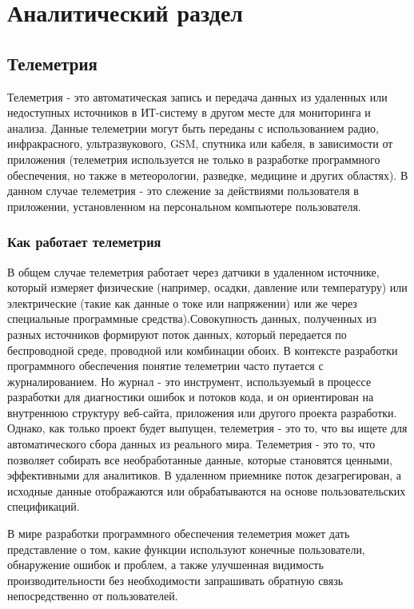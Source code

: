 \chapter{Аналитический раздел}
\label{cha:analysis}
%
%
\section{Телеметрия}
Телеметрия - это автоматическая запись и передача данных из удаленных или недоступных источников в ИТ-систему в другом месте для мониторинга и анализа. Данные телеметрии могут быть переданы с использованием радио, инфракрасного, ультразвукового, GSM, спутника или кабеля, в зависимости от приложения (телеметрия используется не только в разработке программного обеспечения, но также в метеорологии, разведке, медицине и других областях).
В данном случае телеметрия - это слежение за действиями пользователя в приложении, установленном на персональном компьютере пользователя.
\subsection{Как работает телеметрия}
В общем случае телеметрия работает через датчики в удаленном источнике, который измеряет физические (например, осадки, давление или температуру) или электрические (такие как данные о токе или напряжении) или же через специальные программные средства).Совокупность данных, полученных из разных источников формируют поток данных, который передается по беспроводной среде, проводной или комбинации обоих.
В контексте разработки программного обеспечения понятие телеметрии часто путается с журналированием. Но журнал - это инструмент, используемый в процессе разработки для диагностики ошибок и потоков кода, и он ориентирован на внутреннюю структуру веб-сайта, приложения или другого проекта разработки. Однако, как только проект будет выпущен, телеметрия - это то, что вы ищете для автоматического сбора данных из реального мира. Телеметрия - это то, что позволяет собирать все необработанные данные, которые становятся ценными, эффективными для аналитиков.
В удаленном приемнике поток дезагрегирован, а исходные данные отображаются или обрабатываются на основе пользовательских спецификаций.

В мире разработки программного обеспечения телеметрия может дать представление о том, какие функции используют конечные пользователи, обнаружение ошибок и проблем, а также улучшенная видимость производительности без необходимости запрашивать обратную связь непосредственно от пользователей.

